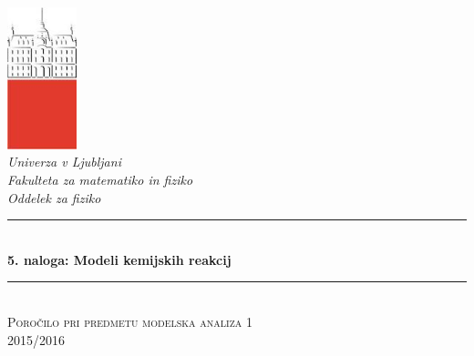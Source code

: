\documentclass[slovene,11pt,a4paper]{article}
\numberwithin{equation}{section} %
\numberwithin{figure}{section} %
\numberwithin{table}{section} %
\begin{document}
\begin{titlepage}

\newcommand{\HRule}{\rule{\linewidth}{0.5mm}} %

\center %


 

\includegraphics[width=2cm]{slike/aaa}\\[0.5cm]
 
\textit{Univerza v Ljubljani}\\
\textit{Fakulteta za {\color{red}matematiko in fiziko}}\\[0.5cm]

\emph{Oddelek za fiziko}\\[0.5cm] %


\HRule \\[0.4cm]
\huge {\bfseries 5. naloga: Modeli kemijskih reakcij}\\[0.4cm] %
\HRule \\[0.5cm] 

 \textsc{\large Poročilo pri predmetu modelska analiza 1}\\
 \textsc{\large 2015/2016}\\[1cm] %
 

\end{titlepage}
\end{document}

